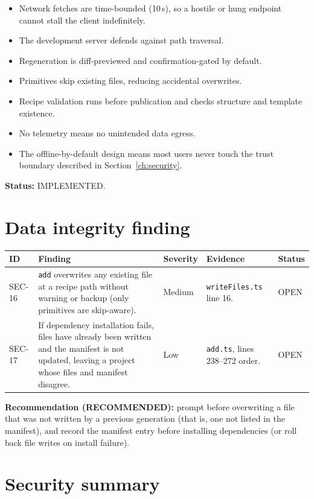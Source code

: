 \begin{itemize}
  \item Network fetches are time-bounded (10\,s), so a hostile or hung endpoint
        cannot stall the client indefinitely.
  \item The development server defends against path traversal.
  \item Regeneration is diff-previewed and confirmation-gated by default.
  \item Primitives skip existing files, reducing accidental overwrites.
  \item Recipe validation runs before publication and checks structure and template
        existence.
  \item No telemetry means no unintended data egress.
  \item The offline-by-default design means most users never touch the trust
        boundary described in Section~\ref{ch:security}.
\end{itemize}

\textbf{Status:} IMPLEMENTED.

\section{Data integrity finding}

\begin{longtable}{p{1.3cm}p{3.6cm}p{1.9cm}p{5.8cm}p{1.6cm}}
\toprule
\textbf{ID} & \textbf{Finding} & \textbf{Severity} & \textbf{Evidence} & \textbf{Status} \\
\midrule

SEC-16 & \texttt{add} overwrites any existing file at a recipe path without warning
or backup (only primitives are skip-aware). & Medium &
\texttt{writeFiles.ts} line 16. & OPEN \\
SEC-17 & If dependency installation fails, files have already been written and the
manifest is not updated, leaving a project whose files and manifest disagree. &
Low & \texttt{add.ts}, lines 238--272 order. & OPEN \\
\bottomrule
\end{longtable}

\textbf{Recommendation (RECOMMENDED):} prompt before overwriting a file that was
not written by a previous generation (that is, one not listed in the manifest), and
record the manifest entry before installing dependencies (or roll back file writes
on install failure).

\section{Security summary}

